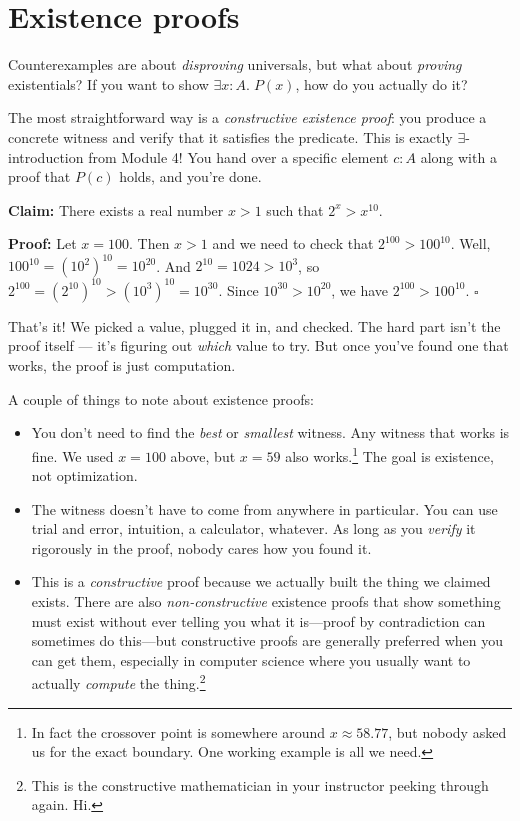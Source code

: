 \documentclass[11pt]{article}
\begin{document}
\section{Existence proofs}

Counterexamples are about \emph{disproving} universals, but what about \emph{proving} existentials? If you want to show $\exists x : A.\; P(x)$, how do you actually do it?

The most straightforward way is a \emph{constructive existence proof}: you produce a concrete witness and verify that it satisfies the predicate. This is exactly $\exists$-introduction from Module 4! You hand over a specific element $c : A$ along with a proof that $P(c)$ holds, and you're done.

\textbf{Claim:} There exists a real number $x > 1$ such that $2^x > x^{10}$.

\textbf{Proof:} Let $x = 100$. Then $x > 1$ and we need to check that $2^{100} > 100^{10}$. Well, $100^{10} = (10^2)^{10} = 10^{20}$. And $2^{10} = 1024 > 10^3$, so $2^{100} = (2^{10})^{10} > (10^3)^{10} = 10^{30}$. Since $10^{30} > 10^{20}$, we have $2^{100} > 100^{10}$. \hfill $\square$

That's it! We picked a value, plugged it in, and checked. The hard part isn't the proof itself --- it's figuring out \emph{which} value to try. But once you've found one that works, the proof is just computation.

A couple of things to note about existence proofs:
\begin{itemize}
  \item You don't need to find the \emph{best} or \emph{smallest} witness. Any witness that works is fine. We used $x = 100$ above, but $x = 59$ also works.\footnote{In fact the crossover point is somewhere around $x \approx 58.77$, but nobody asked us for the exact boundary. One working example is all we need.} The goal is existence, not optimization.
  \item The witness doesn't have to come from anywhere in particular. You can use trial and error, intuition, a calculator, whatever. As long as you \emph{verify} it rigorously in the proof, nobody cares how you found it.
  \item This is a \emph{constructive} proof because we actually built the thing we claimed exists. There are also \emph{non-constructive} existence proofs that show something must exist without ever telling you what it is---proof by contradiction can sometimes do this---but constructive proofs are generally preferred when you can get them, especially in computer science where you usually want to actually \emph{compute} the thing.\footnote{This is the constructive mathematician in your instructor peeking through again. Hi.}
\end{itemize}
\end{document}
